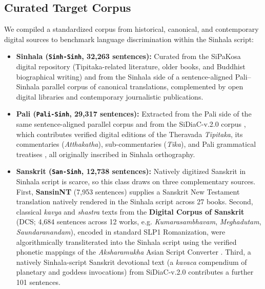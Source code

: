 \documentclass[11pt]{article}
\begin{document}
\subsection{Curated Target Corpus}
We compiled a standardized corpus from historical, canonical, and contemporary digital sources to benchmark language discrimination within the Sinhala script:
\begin{itemize}
    \item \textbf{Sinhala (\texttt{Sinh-Sinh}, 32,263 sentences):} Curated from the SiPaKosa digital repository (Tipitaka-related literature, older books, and Buddhist biographical writing) and from the Sinhala side of a sentence-aligned Pali--Sinhala parallel corpus of canonical translations, complemented by open digital libraries and contemporary journalistic publications.
    \item \textbf{Pali (\texttt{Pali-Sinh}, 29,317 sentences):} Extracted from the Pali side of the same sentence-aligned parallel corpus and from the SiDiaC-v.2.0 corpus \cite{welgama2021sidiac}, which contributes verified digital editions of the Theravada \textit{Tipitaka}, its commentaries (\textit{Atthakatha}), sub-commentaries (\textit{Tika}), and Pali grammatical treatises \cite{norman1983pali}, all originally inscribed in Sinhala orthography.
    \item \textbf{Sanskrit (\texttt{San-Sinh}, 12,738 sentences):} Natively digitized Sanskrit in Sinhala script is scarce, so this class draws on three complementary sources. First, \textbf{SansinNT} (7,953 sentences) supplies a Sanskrit New Testament translation natively rendered in the Sinhala script across 27 books. Second, classical \textit{kavya} and \textit{shastra} texts from the \textbf{Digital Corpus of Sanskrit} (DCS; 4,684 sentences across 12 works, e.g. \textit{Kumarasambhavam}, \textit{Meghadutam}, \textit{Saundaranandam}), encoded in standard SLP1 Romanization, were algorithmically transliterated into the Sinhala script using the verified phonetic mappings of the \textit{Aksharamukha} Asian Script Converter \cite{rajan2023aksharamukha}. Third, a natively Sinhala-script Sanskrit devotional text (a \textit{kavaca} compendium of planetary and goddess invocations) from SiDiaC-v.2.0 \cite{welgama2021sidiac} contributes a further 101 sentences.
\end{itemize}
\end{document}
